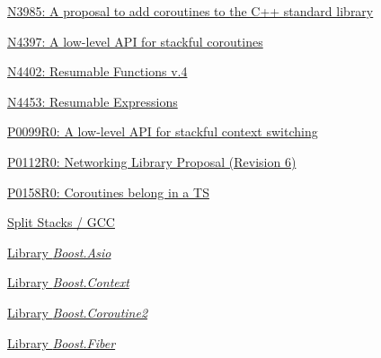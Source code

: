 \begin{thebibliography}{99}

        \href{http://www.open-std.org/jtc1/sc22/wg21/docs/papers/2014/n3985.pdf}
        {N3985: A proposal to add coroutines to the C++ standard library}

        \href{http://www.open-std.org/jtc1/sc22/wg21/docs/papers/2015/n4397.pdf}
        {N4397: A low-level API for stackful coroutines}

        \href{https://isocpp.org/files/papers/N4402.pdf}
        {N4402: Resumable Functions v.4}

        \href{http://www.open-std.org/jtc1/sc22/wg21/docs/papers/2015/n4453.pdf}
        {N4453: Resumable Expressions}

        \href{http://www.open-std.org/jtc1/sc22/wg21/docs/papers/2015/p0099r0.pdf}
        {P0099R0: A low-level API for stackful context switching}

        \href{http://www.open-std.org/jtc1/sc22/wg21/docs/papers/2015/p0112r0.html}
        {P0112R0: Networking Library Proposal (Revision 6)}

        \href{http://www.open-std.org/jtc1/sc22/wg21/docs/papers/2015/p0158r0.html}
        {P0158R0: Coroutines belong in a TS}

        \href{http://gcc.gnu.org/wiki/SplitStacks}
        {Split Stacks / GCC}

        \href{http://www.boost.org/doc/libs/release/doc/html/boost\_asio.html}
        {Library \emph{Boost.Asio}}

        \href{http://www.boost.org/doc/libs/release/libs/context/doc/html/index.html}
        {Library \emph{Boost.Context}}

        \href{http://www.boost.org/doc/libs/release/libs/coroutine2/doc/html/index.html}
        {Library \emph{Boost.Coroutine2}}

        \href{http://olk.github.io/libs/fiber/doc/html/index.html}
        {Library \emph{Boost.Fiber}}

\end{thebibliography}
